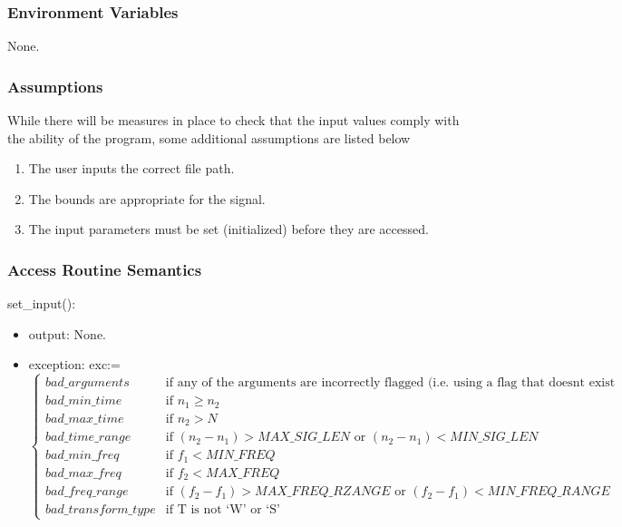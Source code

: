 \documentclass[12pt, titlepage]{article}
\begin{document}
\subsubsection{Environment Variables}
None.

\subsubsection{Assumptions}
While there will be measures in place to check that the input values comply with the ability of the program, some additional assumptions are listed below
\begin{enumerate}
\item The user inputs the correct file path.
\item The bounds are appropriate for the signal.
\item The input parameters must be set (initialized) before they are accessed. 
\end{enumerate}

\subsubsection{Access Routine Semantics}

set\_input():
\begin{itemize}
\item output: None.
\item exception: exc:=
\[ \begin{cases} 
 bad\_arguments & \text{if any of the arguments are incorrectly flagged (i.e. using a flag that doesnt exist}\\ 
 bad\_min\_time & \text{if } n_1 \geq n_2 \\
 bad\_max\_time & \text{if } n_2>N \\ 
 bad\_time\_range & \text{if } (n_2 - n_1)> MAX\_SIG\_LEN \text{ or } (n_2 - n_1)<MIN\_SIG\_LEN \\
 bad\_min\_freq  & \text{if } f_1 < MIN\_FREQ \\
 bad\_max\_freq  & \text{if } f_2 < MAX\_FREQ \\
 bad\_freq\_range &  \text{if } (f_2 - f_1)> MAX\_FREQ\_RZANGE \text{ or } (f_2 - f_1)<MIN\_FREQ\_RANGE\\
  bad\_transform\_type &  \text{if T is not `W' or `S'}
   \end{cases}
\]
\end{itemize}
\end{document}

